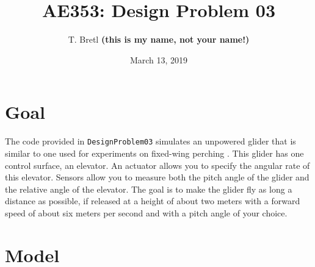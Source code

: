 \documentclass[12pt]{article}
\title{AE353: Design Problem 03}
\author{T. Bretl \textbf{(this is my name, not your name!)}}
\date{March 13, 2019}
\begin{document}
\maketitle


\section{Goal}

The code provided in \lstinline!DesignProblem03! simulates an unpowered glider that is similar to one used for experiments on fixed-wing perching \cite{Roberts2009,Moore2014}. This glider has one control surface, an elevator. An actuator allows you to specify the angular rate of this elevator. Sensors allow you to measure both the pitch angle of the glider and the relative angle of the elevator. The goal is to make the glider fly as long a distance as possible, if released at a height of about two meters with a forward speed of about six meters per second and with a pitch angle of your choice.

\section{Model}
\end{document}
